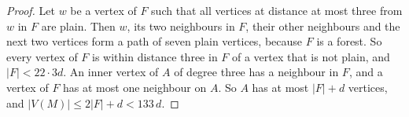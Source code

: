 \begin{proof}
 Let $w$ be a vertex of $F$ such that all vertices at distance at most three
from $w$ in $F$ are plain. Then $w$, its two neighbours in $F$, their other neighbours and the
next two vertices form a path of seven plain vertices, because $F$ is a forest. So every vertex
of $F$ is within distance three in $F$ of a vertex that is not plain, and $|F|<22\cdot3d$. An inner vertex of $A$ of
degree three has a neighbour in $F$, and a vertex of $F$ has at most one neighbour on $A$. So
$A$ has at most $|F|+d$ vertices, and $|V(M)|\le2|F|+d<133\,d$.
\end{proof}

